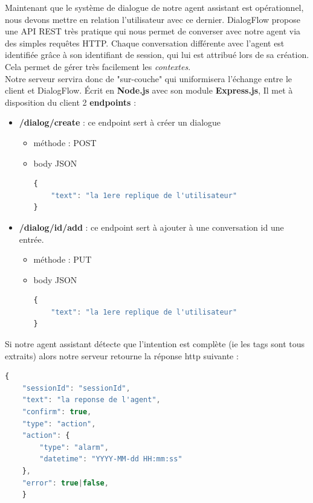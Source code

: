 Maintenant que le système de dialogue de notre agent assistant est opérationnel, nous devons mettre en relation l'utilisateur avec ce dernier. DialogFlow propose une API REST très pratique
qui nous permet de converser avec notre agent via des simples requêtes HTTP. Chaque conversation différente avec l'agent est identifiée grâce à son identifiant de session,
qui lui est attribué lors de sa création. Cela permet de gérer très facilement les \emph{contextes}.\\

Notre serveur servira donc de "sur-couche" qui uniformisera l'échange entre le client et DialogFlow. Écrit en \textbf{Node.js} avec son module \textbf{Express.js},
Il met à disposition du client 2 \textbf{endpoints} :\\
\begin{itemize}
    \item \textbf{/dialog/create} : ce endpoint sert à créer un dialogue
    \begin{itemize}
        \item méthode : POST
        \item body JSON 
        \begin{lstlisting}[language=Javascript]
{
    "text": "la 1ere replique de l'utilisateur"
}
        \end{lstlisting}
    \end{itemize}
    \item \textbf{/dialog/{id}/add} : ce endpoint sert à ajouter à une conversation id une entrée.
    \begin{itemize}
        \item méthode : PUT
        \item body JSON 
        \begin{lstlisting}[language=Javascript]
{
    "text": "la 1ere replique de l'utilisateur"
}
        \end{lstlisting}
    \end{itemize}
\end{itemize}


Si notre agent assistant détecte que l'intention est complète (ie les tags sont tous extraits) alors notre serveur retourne la réponse http suivante :\\

\begin{lstlisting}[language=Javascript]
{
    "sessionId": "sessionId",
    "text": "la reponse de l'agent",
    "confirm": true,
    "type": "action",
    "action": {
        "type": "alarm",
        "datetime": "YYYY-MM-dd HH:mm:ss"
    },
    "error": true|false,
    }
\end{lstlisting}

